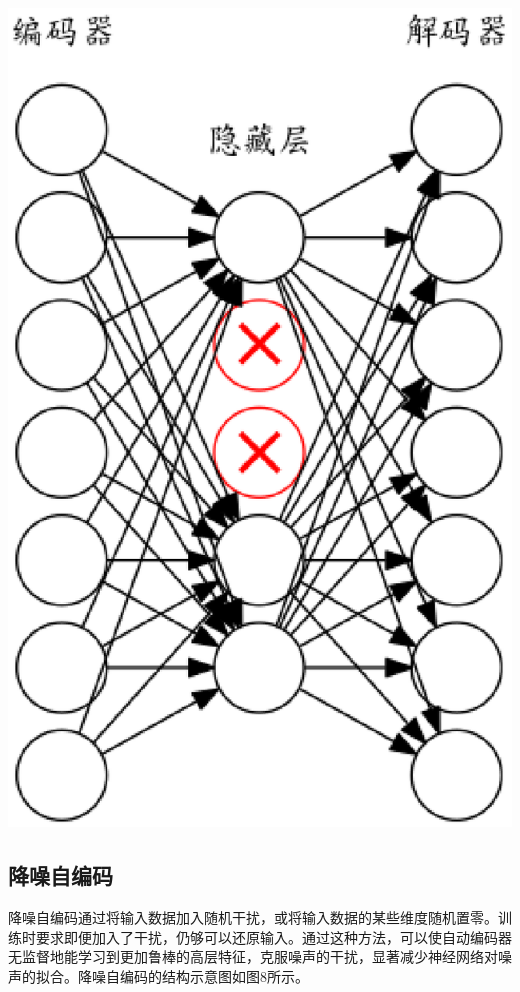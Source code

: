 \documentclass{ctacn}%
\begin{document}
\begin{multicols}{2}
\begin{center}
	\includegraphics[scale=0.16, trim=0 0 0 0]{figs/dropout}\\
	\label{fig7}
\end{center}

\subsection{降噪自编码}
降噪自编码通过将输入数据加入随机干扰，或将输入数据的某些维度随机置零。训练时要求即便加入了干扰，仍够可以还原输入。通过这种方法，可以使自动编码器无监督地能学习到更加鲁棒的高层特征，克服噪声的干扰，显著减少神经网络对噪声的拟合。降噪自编码的结构示意图如图8所示。



\end{multicols}
\end{document}

